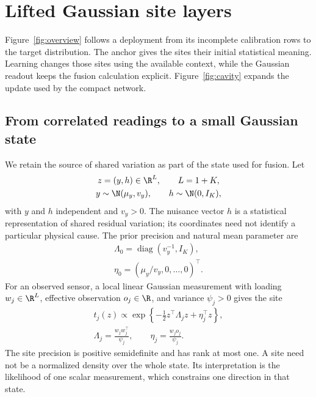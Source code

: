 \section{Lifted Gaussian site layers}
\label{sec:method}

Figure~\ref{fig:overview} follows a deployment from its incomplete calibration rows to the target distribution. The anchor gives the sites their initial statistical meaning. Learning changes those sites using the available context, while the Gaussian readout keeps the fusion calculation explicit. Figure~\ref{fig:cavity} expands the update used by the compact network.

\subsection{From correlated readings to a small Gaussian state}

We retain the source of shared variation as part of the state used for fusion. Let
\begin{equation}
  \begin{gathered}
  z=(y,h)\in\R^{L},\qquad L=1+K,\\
  y\sim\N(\mu_y,v_y),\qquad h\sim\N(0,I_K),
  \end{gathered}
  \label{meth:latent}
\end{equation}
with $y$ and $h$ independent and $v_y>0$. The nuisance vector $h$ is a statistical representation of shared residual variation; its coordinates need not identify a particular physical cause. The prior precision and natural mean parameter are
\begin{equation}
  \begin{gathered}
  \Lambda_0=\operatorname{diag}(v_y^{-1},I_K),\\
  \eta_0=(\mu_y/v_y,0,\ldots,0)^\top.
  \end{gathered}
  \label{meth:prior}
\end{equation}
For an observed sensor, a local linear Gaussian measurement with loading $w_j\in\R^L$, effective observation $o_j\in\R$, and variance $\psi_j>0$ gives the site
\begin{equation}
  \begin{gathered}
  t_j(z)\propto\exp\!\left\{
  -\tfrac12 z^\top\Lambda_jz+\eta_j^\top z\right\},\\
  \Lambda_j=\frac{w_jw_j^\top}{\psi_j},\qquad
  \eta_j=\frac{w_jo_j}{\psi_j}.
  \end{gathered}
  \label{meth:site}
\end{equation}
The site precision is positive semidefinite and has rank at most one. A site need not be a normalized density over the whole state. Its interpretation is the likelihood of one scalar measurement, which constrains one direction in that state.

